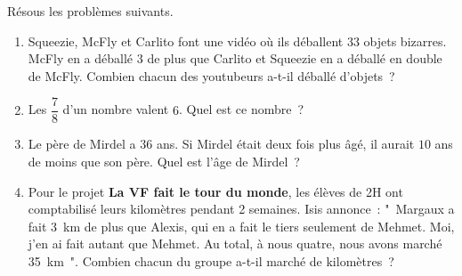 %
%
    Résous les problèmes suivants.
    \begin{enumerate}
        \item Squeezie, McFly et Carlito font une vidéo où ils déballent $33$
              objets bizarres. McFly en a déballé $3$ de plus que Carlito et
              Squeezie en a déballé en double de McFly. Combien chacun des
              youtubeurs a-t-il déballé d'objets~?

        \item Les $\dfrac{7}{8}$ d'un nombre valent $6$. Quel est ce nombre~?

        \item Le père de Mirdel a $36$ ans. Si Mirdel était deux fois plus âgé, il
              aurait $10$ ans de moins que son père. Quel est l'âge de Mirdel~?

        \item Pour le projet \textbf{La VF fait le tour du monde}, les élèves de
              2\ieme H ont comptabilisé leurs kilomètres pendant 2
              semaines. Isis annonce~: "~Margaux a fait \SI{3}{km} de plus que Alexis,
              qui en a fait le tiers seulement de Mehmet. Moi, j'en ai fait autant
              que Mehmet. Au total, à nous quatre, nous avons marché \SI{35}{km}~".
              Combien chacun du groupe a-t-il marché de kilomètres~?


\end{enumerate}
